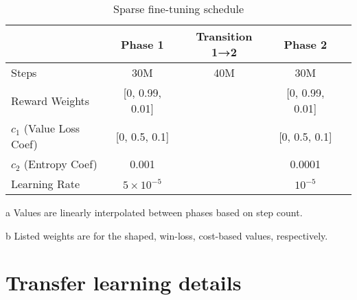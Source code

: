 \documentclass[conference,onecolumn]{IEEEtran}
\newcounter{supptable}
\newenvironment{supptable}
  {\renewcommand{\tablename}{Supplemental Table}\setcounter{table}{\value{supptable}}\addtocounter{supptable}{1}\begin{table}}
  {\end{table}\setcounter{supptable}{\value{table}}}
\begin{document}
\begin{supptable}[H]
    \centering
    \begin{threeparttable}
    \caption{Sparse fine-tuning schedule}
    \label{tab:sparse-finetuning-schedule}
    \begin{tabular}{lcccc}
    \toprule
     & Phase 1 & Transition 1→2\tnote{a} & Phase 2 \\
     \midrule
    Steps & 30M & 40M & 30M \\
    Reward Weights\tnote{b} & [0, 0.99, 0.01] &  & [0, 0.99, 0.01] \\
    $c_1$ (Value Loss Coef)\tnote{b} & [0, 0.5, 0.1] &  & [0, 0.5, 0.1]\\
    $c_2$ (Entropy Coef) & 0.001 & & 0.0001 \\
    Learning Rate & $5 \times 10^{-5}$ & & $10^{-5}$ \\
    \bottomrule
    \end{tabular}
    \begin{tablenotes}
       \item[a] Values are linearly interpolated between phases based on step count.
       \item[b] Listed weights are for the shaped, win-loss, cost-based values, respectively.
    \end{tablenotes}
    \end{threeparttable}
\end{supptable}

\section{Transfer learning details}
\label{appendix:transfer-learning-details}
\end{document}

